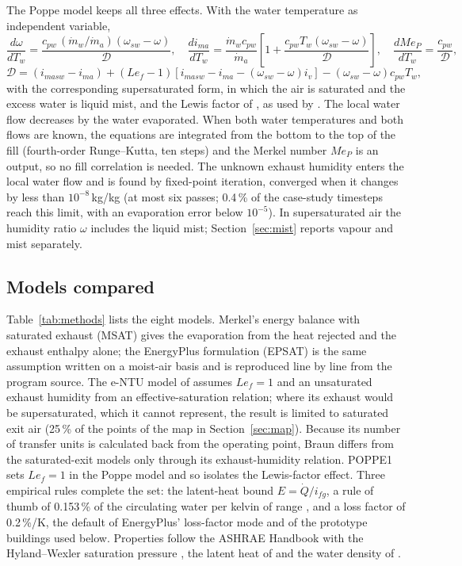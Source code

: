 \documentclass[preprint,12pt]{elsarticle}
\begin{document}
The Poppe model \citep{poppe1991berechnung,kloppers2005critical} keeps all three effects. With the water temperature as
independent variable,
\begin{equation}
\frac{d\omega}{dT_w} = \frac{c_{pw}\,(\dot m_w/\dot m_a)(\omega_{sw}-\omega)}{\mathcal{D}},\quad
\frac{di_{ma}}{dT_w} = \frac{\dot m_w c_{pw}}{\dot m_a}\left[1+\frac{c_{pw}T_w(\omega_{sw}-\omega)}{\mathcal{D}}\right],\quad
\frac{dMe_P}{dT_w} = \frac{c_{pw}}{\mathcal{D}},
\end{equation}
\begin{equation}
\mathcal{D} = (i_{masw}-i_{ma}) + (Le_f-1)\left[i_{masw}-i_{ma}-(\omega_{sw}-\omega)i_v\right] - (\omega_{sw}-\omega)c_{pw}T_w,
\end{equation}
with the corresponding supersaturated form, in which the air is saturated and the excess water is liquid mist, and the
Lewis factor of \citet{bosnjakovic1965technical}, as used by \citet{kloppers2005lewis}. The local water flow decreases
by the water evaporated. When both water temperatures and both flows are known, the equations are integrated from the
bottom to the top of the fill (fourth-order Runge--Kutta, ten steps) and the Merkel number $Me_P$ is an output, so no
fill correlation is needed. The unknown exhaust humidity enters the local water flow and is found by fixed-point
iteration, converged when it changes by less than $10^{-8}$\,kg/kg (at most six passes; 0.4\,\% of the case-study
timesteps reach this limit, with an evaporation error below $10^{-5}$). In supersaturated air the humidity ratio
$\omega$ includes the liquid mist; Section~\ref{sec:mist} reports vapour and mist separately.

\subsection{Models compared}
Table~\ref{tab:methods} lists the eight models. Merkel's energy balance with saturated exhaust (MSAT) gives the
evaporation from the heat rejected and the exhaust enthalpy alone; the EnergyPlus formulation (EPSAT) is the same
assumption written on a moist-air basis and is reproduced line by line from the program source. The e-NTU model of
\citet{braun1989effectiveness} assumes $Le_f=1$ and an unsaturated exhaust humidity from an effective-saturation
relation; where its exhaust would be supersaturated, which it cannot represent, the result is limited to saturated exit
air (25\,\% of the points of the map in Section~\ref{sec:map}). Because its number of transfer units is calculated back
from the operating point, Braun differs from the saturated-exit models only through its exhaust-humidity relation.
POPPE1 sets $Le_f=1$ in the Poppe model and so isolates the Lewis-factor effect. Three empirical rules complete the set:
the latent-heat bound $E=\dot Q/i_{fg}$, a rule of thumb of 0.153\,\% of the circulating water per kelvin of range
\citep{green2008perrys}, and a loss factor of 0.2\,\%/K, the default of EnergyPlus' loss-factor mode and of the
prototype buildings used below. Properties follow the ASHRAE Handbook \citep{ashrae2021fundamentals} with the
Hyland--Wexler saturation pressure \citep{hyland1983formulations}, the latent heat of \citet{hendersonsellers1984new}
and the water density of \citet{kell1975density}.
\end{document}
